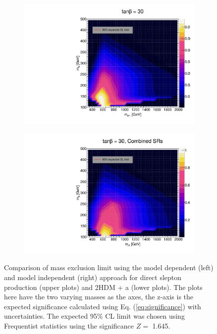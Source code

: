 \documentclass[12pt, a4paper]{book}
\begin{document}
\begin{figure}[!ht]
\begin{subfigure}[b]{0.49\textwidth}
      \includegraphics[width=1\textwidth]{Limits/2HDM/2HDM_ll_tb30.pdf}
   \end{subfigure}
   \hfill
   \begin{subfigure}[b]{0.49\textwidth}
      \centering
      \includegraphics[width=1\textwidth]{Limits/Model_independent/2HDM/2HDM_ll_tb30.pdf}
   \end{subfigure}
   \caption[Comparison of mass exclusion limit using the model dependent and model independent approach for direct slepton production and 2HDM + a]{
      Comparison of mass exclusion limit using the model dependent (left) and model independent (right) approach for direct slepton production (upper plots) and 2HDM + a (lower plots). The plots here have the two varying masses as the axes, the z-axis is the expected significance calculated using Eq. (\ref{eq:significance}) with uncertainties. The expected 95\% CL limit was chosen using Frequentist statistics using the significance $Z=$ 1.645.   
}
\end{figure}
\end{document}

